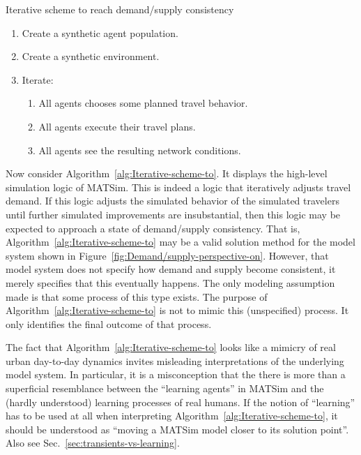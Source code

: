 \begin{algorithm}
\caption{\label{alg:Iterative-scheme-to}Iterative scheme to reach demand/supply
consistency}

\begin{enumerate}
\item Create a synthetic agent population.
\item Create a synthetic environment.
\item Iterate:

\begin{enumerate}
\item All agents chooses some planned travel behavior.
\item All agents execute their travel plans.
\item All agents see the resulting network conditions.\end{enumerate}
\end{enumerate}
\end{algorithm}


Now consider Algorithm~\ref{alg:Iterative-scheme-to}. It displays
the high-level simulation logic of MATSim. This is indeed a logic
that iteratively adjusts travel demand. If this logic adjusts the
simulated behavior of the simulated travelers until further simulated
improvements are insubstantial, then this logic may be expected to
approach a state of demand/supply consistency. That is, Algorithm~\ref{alg:Iterative-scheme-to}
may be a valid solution method for the model system shown in Figure~\ref{fig:Demand/supply-perspective-on}.
However, that model system does not specify how demand and supply
become consistent, it merely specifies that this eventually happens.
The only modeling assumption made is that some process of this type
exists. The purpose of Algorithm~\ref{alg:Iterative-scheme-to} is
not to mimic this (unspecified) process. It only identifies the final
outcome of that process.

The fact that Algorithm~\ref{alg:Iterative-scheme-to} looks like
a mimicry of real urban day-to-day dynamics invites misleading interpretations
of the underlying model system. In particular, it is a misconception
that the there is more than a superficial resemblance between the
{}``learning agents'' in MATSim and the (hardly understood) learning
processes of real humans. If the notion of {}``learning'' has to
be used at all when interpreting Algorithm~\ref{alg:Iterative-scheme-to},
it should be understood as {}``moving a MATSim model closer to its
solution point''.  Also see Sec.~\ref{sec:transients-vs-learning}.

